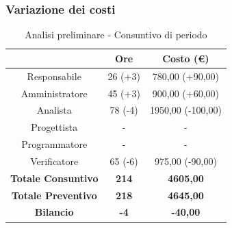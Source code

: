 \subsubsection{Variazione dei costi} \label{subsubsection:variazione_costi_analisi}
\begin{table}[H]
  \centering
  \renewcommand{\arraystretch}{1.8}
  \begin{tabular}{c|c|c}
    \rowcolor[HTML]{125E28}
    \multicolumn{1}{c}{\color[HTML]{FFFFFF}\textbf{Ruolo}}
                               & \multicolumn{1}{c}{\color[HTML]{FFFFFF}\textbf{Ore}}
                               & \multicolumn{1}{c}{\color[HTML]{FFFFFF}\textbf{Costo (€)}}                     \\
    \hline
    Responsabile               & 26 (+3)                                                    & 780,00 (+90,00)   \\
    Amministratore             & 45 (+3)                                                    & 900,00 (+60,00)   \\
    Analista                   & 78 (-4)                                                    & 1950,00 (-100,00) \\
    Progettista                & -                                                          & -                 \\
    Programmatore              & -                                                          & -                 \\
    Verificatore               & 65 (-6)                                                    & 975,00 (-90,00)   \\
    \textbf{Totale Consuntivo} & \textbf{214}                                               & \textbf{4605,00}  \\
    \textbf{Totale Preventivo} & \textbf{218}                                               & \textbf{4645,00}  \\
    \textbf{Bilancio}          & \textbf{-4}                                                & \textbf{-40,00}   \\
  \end{tabular}
  \caption{Analisi preliminare - Consuntivo di periodo}
\end{table}


